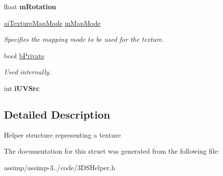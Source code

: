 \begin{DoxyCompactItemize}
\item 
\hypertarget{struct_assimp_1_1_d3_d_s_1_1_texture_a93e9ab2d0352d905e75abb678fe2cdcb}{float {\bfseries m\+Rotation}}\label{struct_assimp_1_1_d3_d_s_1_1_texture_a93e9ab2d0352d905e75abb678fe2cdcb}

\item 
\hypertarget{struct_assimp_1_1_d3_d_s_1_1_texture_a88d55e2dd528cbf0644f55e150cea25b}{\hyperlink{material_8h_a6cbe56056751aa80e8dd714632a49de0}{ai\+Texture\+Map\+Mode} \hyperlink{struct_assimp_1_1_d3_d_s_1_1_texture_a88d55e2dd528cbf0644f55e150cea25b}{m\+Map\+Mode}}\label{struct_assimp_1_1_d3_d_s_1_1_texture_a88d55e2dd528cbf0644f55e150cea25b}

\begin{DoxyCompactList}\small\item\em Specifies the mapping mode to be used for the texture. \end{DoxyCompactList}\item 
\hypertarget{struct_assimp_1_1_d3_d_s_1_1_texture_aee454bf7d2a3548ab132a9b317d8548f}{bool \hyperlink{struct_assimp_1_1_d3_d_s_1_1_texture_aee454bf7d2a3548ab132a9b317d8548f}{b\+Private}}\label{struct_assimp_1_1_d3_d_s_1_1_texture_aee454bf7d2a3548ab132a9b317d8548f}

\begin{DoxyCompactList}\small\item\em Used internally. \end{DoxyCompactList}\item 
\hypertarget{struct_assimp_1_1_d3_d_s_1_1_texture_ac03c387c33cec601a7efa23af8eb999c}{int {\bfseries i\+U\+V\+Src}}\label{struct_assimp_1_1_d3_d_s_1_1_texture_ac03c387c33cec601a7efa23af8eb999c}

\end{DoxyCompactItemize}


\subsection{Detailed Description}
Helper structure representing a texture 

The documentation for this struct was generated from the following file\+:\begin{DoxyCompactItemize}
\item 
assimp/assimp-\/3../code/3\+D\+S\+Helper.\+h\end{DoxyCompactItemize}
